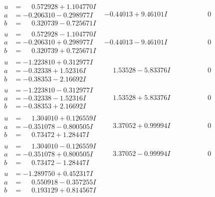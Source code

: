 \documentclass[1p]{elsarticle_modified}
\theoremstyle{definition}
\begin{document}
$$\begin{array}{c|c|c}
\begin{aligned}
u &= \phantom{-}0.572928 + 1.104770 I \\
a &= -0.206310 - 0.298977 I \\
b &= \phantom{-}0.320739 - 0.725671 I\end{aligned}
 & -0.44013 + 9.46101 I & \phantom{-0.000000 } 0 \\ \hline\begin{aligned}
u &= \phantom{-}0.572928 - 1.104770 I \\
a &= -0.206310 + 0.298977 I \\
b &= \phantom{-}0.320739 + 0.725671 I\end{aligned}
 & -0.44013 - 9.46101 I & \phantom{-0.000000 } 0 \\ \hline\begin{aligned}
u &= -1.223810 + 0.312977 I \\
a &= -0.32338 + 1.52316 I \\
b &= -0.38353 - 2.16692 I\end{aligned}
 & \phantom{-}1.53528 - 5.83376 I & \phantom{-0.000000 } 0 \\ \hline\begin{aligned}
u &= -1.223810 - 0.312977 I \\
a &= -0.32338 - 1.52316 I \\
b &= -0.38353 + 2.16692 I\end{aligned}
 & \phantom{-}1.53528 + 5.83376 I & \phantom{-0.000000 } 0 \\ \hline\begin{aligned}
u &= \phantom{-}1.304010 + 0.126559 I \\
a &= -0.351078 - 0.800505 I \\
b &= \phantom{-}0.73472 + 1.28447 I\end{aligned}
 & \phantom{-}3.37052 + 0.99994 I & \phantom{-0.000000 } 0 \\ \hline\begin{aligned}
u &= \phantom{-}1.304010 - 0.126559 I \\
a &= -0.351078 + 0.800505 I \\
b &= \phantom{-}0.73472 - 1.28447 I\end{aligned}
 & \phantom{-}3.37052 - 0.99994 I & \phantom{-0.000000 } 0 \\ \hline\begin{aligned}
u &= -1.289750 + 0.452317 I \\
a &= \phantom{-}0.550918 - 0.357255 I \\
b &= \phantom{-}0.193129 + 0.814567 I\end{aligned}

\end{array}$$
\end{document}
